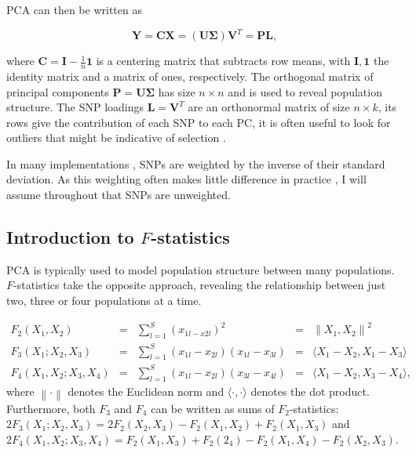 \documentclass[12pt,a4pape, fullpage]{article}
\newcommand{\norm}[1]{\left\lVert#1\right\rVert}
\newcommand{\normsq}[1]{\left\lVert#1\right\rVert^2}
\newcommand{\MX}{\mathbf{X}} %
\newcommand{\MC}{\mathbf{C}} %
\newcommand{\MY}{\mathbf{Y}} %
\newcommand{\MP}{\mathbf{P}} %
\newcommand{\ML}{\mathbf{L}} %
\newcommand{\MSINGULAR}{\mathbf{\Sigma}} %
\begin{document}
	PCA can then be written as
	
	\begin{equation}
	\MY = \MC\MX = (\mathbf{U} \MSINGULAR) \mathbf{V}^T = \MP\ML\text{,}
	\end{equation}
	
	where $\MC = \mathbf{I} -\frac{1}{n}\mathbf{1}$ is a centering matrix that subtracts row means, with $\mathbf{I}, \mathbf{1}$  the identity matrix and a matrix of ones, respectively. The orthogonal matrix of principal components $\MP=\mathbf{U}\MSINGULAR$ has size $n \times n$ and is used to reveal population structure. The SNP loadings $\ML=\mathbf{V}^T$ are an orthonormal matrix of size $n \times k$, its rows give the contribution of each SNP to each PC, it is often useful to look for outliers that might be indicative of selection \citep[e.g][]{francois2010}.
	
	In many  implementations \citep[e.g][]{patterson2006}, SNPs are weighted by
    the inverse of their standard deviation. As this weighting often makes little
    difference in practice \citep{mcvean2009}, I will assume throughout that SNPs
    are unweighted.

\subsection{Introduction to $F$-statistics}
PCA is typically used to model population structure between many populations. $F$-statistics take the opposite approach, revealing the relationship between just two,  three or four populations at a time. 

\begin{subequations}
	\begin{align}
	F_2(X_1, X_2) &=& \sum_{l=1}^S(x_{1l - x{2l}})^2 &=& \normsq{X_1, X_2}\\
	F_3(X_1; X_2, X_3) &=& \sum_{l=1}^S(x_{1l} - x_{2l})(x_{1l} - x_{3l}) &=& \langle X_1 - X_2, X_1 - X_3 \rangle\\	
	F_4(X_1, X_2; X_3, X_4) &=& \sum_{l=1}^S(x_{1l} - x_{2l})(x_{3l} - x_{4l}) &=& \langle X_1 - X_2, X_3 - X_4 \rangle	\text{,}
	\end{align}
\end{subequations}
where $\norm{\cdot}$ denotes the Euclidean norm and $\langle \cdot, \cdot \rangle$ denotes the dot product. Furthermore, both $F_3$ and $F_4$ can be written as sums of $F_2$-statistics:
$2F_3(X_1; X_2, X_3) = 2F_2(X_2, X_3) - F_2(X_1, X_2) + F_2(X_1, X_3)$ and $2F_4(X_1, X_2; X_3, X_4) = F_2(X_1, X_3) + F_2(2_4) - F_2(X_1,X_4) - F_2(X_2, X_3)$.
\end{document}
